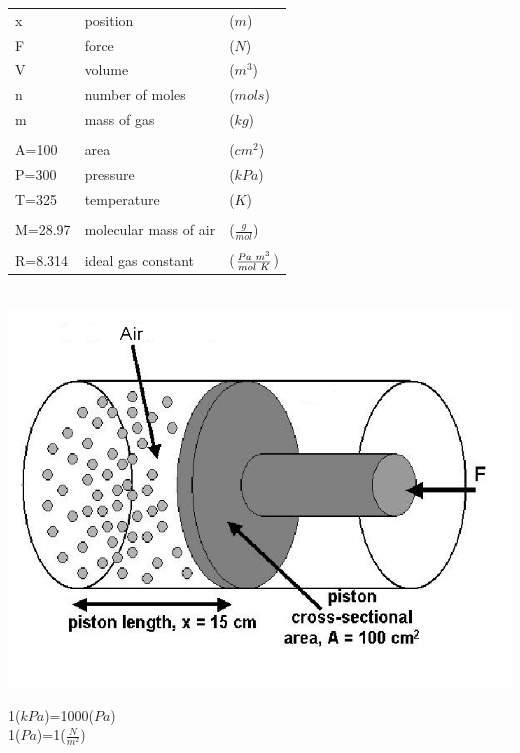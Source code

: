 \documentclass[11pt]{article}
\begin{document}
\begin{description}
            \begin{multicols}{2}
            
            \begin{tabular}{lll}
            x &position &($m$)   \\
            F &force    &($N$)   \\
            V &volume   &($m^3$) \\        
            n &number of moles &($mols$) \\   
            m & mass of gas&($kg$)      \\ 
            \\
            A=100 &area     &($cm^2$)  \\
            P=300 &pressure &($kPa$) \\ 
            T=325 & temperature &($K$) \\\\ 
            M=28.97 & molecular mass of air &($\frac{g}{mol}$)       \\\\ 
            R=8.314 & ideal gas constant &($\frac{Pa\hspace{1mm}m^3}{mol\hspace{1mm}K}$)\\ 
            \end{tabular}\\

            
            \includegraphics[scale=.35]{ideal_gas_law_fig1.png} \\    
            \end{multicols}
               1($kPa$)=1000($Pa$)\\
               1($Pa$)=1($\frac{N}{m^2}$)
\newpage



\end{description}
\end{document}
